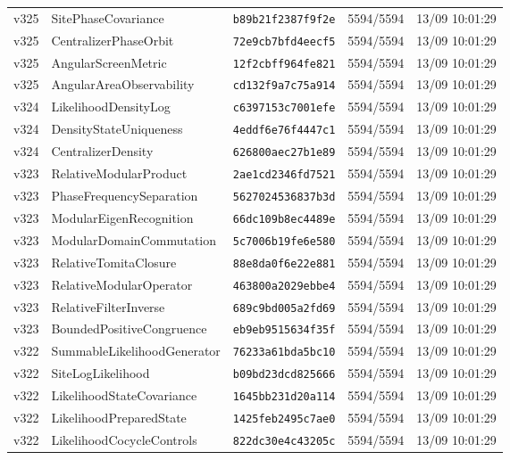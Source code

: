 \documentclass[11pt]{article}
\theoremstyle{definition}\newtheorem{deriv}{Derivation}
\begin{document}
{\begin{longtable}{@{}lllll@{}}
v325 & SitePhaseCovariance & \texttt{b89b21f2387f9f2e} & 5594/5594 & 13/09 10:01:29 \\
v325 & CentralizerPhaseOrbit & \texttt{72e9cb7bfd4eecf5} & 5594/5594 & 13/09 10:01:29 \\
v325 & AngularScreenMetric & \texttt{12f2cbff964fe821} & 5594/5594 & 13/09 10:01:29 \\
v325 & AngularAreaObservability & \texttt{cd132f9a7c75a914} & 5594/5594 & 13/09 10:01:29 \\
v324 & LikelihoodDensityLog & \texttt{c6397153c7001efe} & 5594/5594 & 13/09 10:01:29 \\
v324 & DensityStateUniqueness & \texttt{4eddf6e76f4447c1} & 5594/5594 & 13/09 10:01:29 \\
v324 & CentralizerDensity & \texttt{626800aec27b1e89} & 5594/5594 & 13/09 10:01:29 \\
v323 & RelativeModularProduct & \texttt{2ae1cd2346fd7521} & 5594/5594 & 13/09 10:01:29 \\
v323 & PhaseFrequencySeparation & \texttt{5627024536837b3d} & 5594/5594 & 13/09 10:01:29 \\
v323 & ModularEigenRecognition & \texttt{66dc109b8ec4489e} & 5594/5594 & 13/09 10:01:29 \\
v323 & ModularDomainCommutation & \texttt{5c7006b19fe6e580} & 5594/5594 & 13/09 10:01:29 \\
v323 & RelativeTomitaClosure & \texttt{88e8da0f6e22e881} & 5594/5594 & 13/09 10:01:29 \\
v323 & RelativeModularOperator & \texttt{463800a2029ebbe4} & 5594/5594 & 13/09 10:01:29 \\
v323 & RelativeFilterInverse & \texttt{689c9bd005a2fd69} & 5594/5594 & 13/09 10:01:29 \\
v323 & BoundedPositiveCongruence & \texttt{eb9eb9515634f35f} & 5594/5594 & 13/09 10:01:29 \\
v322 & SummableLikelihoodGenerator & \texttt{76233a61bda5bc10} & 5594/5594 & 13/09 10:01:29 \\
v322 & SiteLogLikelihood & \texttt{b09bd23dcd825666} & 5594/5594 & 13/09 10:01:29 \\
v322 & LikelihoodStateCovariance & \texttt{1645bb231d20a114} & 5594/5594 & 13/09 10:01:29 \\
v322 & LikelihoodPreparedState & \texttt{1425feb2495c7ae0} & 5594/5594 & 13/09 10:01:29 \\
v322 & LikelihoodCocycleControls & \texttt{822dc30e4c43205c} & 5594/5594 & 13/09 10:01:29 \\

\end{longtable}}
\end{document}
